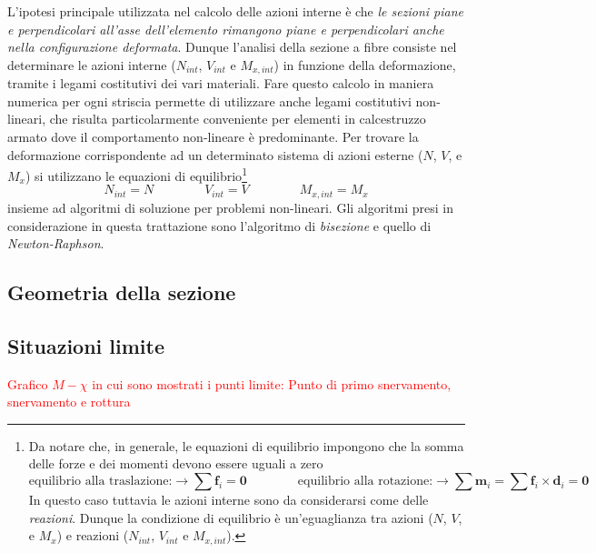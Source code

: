 \documentclass[10pt]{article}
\begin{document}
L'ipotesi principale utilizzata nel calcolo delle azioni interne è che \emph{le sezioni piane e perpendicolari all'asse dell'elemento rimangono piane e perpendicolari anche nella configurazione deformata}.
Dunque l'analisi della sezione a fibre consiste nel determinare le azioni interne ($N_{int}$, $V_{int}$ e $M_{x,int}$) in funzione della deformazione, tramite i legami costitutivi dei vari materiali. Fare questo calcolo in maniera numerica per ogni striscia permette di utilizzare anche legami costitutivi non-lineari, che risulta particolarmente conveniente per elementi in calcestruzzo armato dove il comportamento non-lineare è predominante.
Per trovare la deformazione corrispondente ad un determinato sistema di azioni esterne ($N$, $V$, e $M_x$) si utilizzano le equazioni di equilibrio\footnote{Da notare che, in generale, le equazioni di equilibrio impongono che la somma delle forze e dei momenti devono essere uguali a zero
\begin{equation}
\text{equilibrio alla traslazione:} \rightarrow \sum \mathbf{f}_i = \mathbf{0}
\qquad \qquad
\text{equilibrio alla rotazione:}   \rightarrow \sum \mathbf{m}_i = \sum \mathbf{f}_i \times \mathbf{d}_i = \mathbf{0} 
\end{equation}
In questo caso tuttavia le azioni interne sono da considerarsi come delle \emph{reazioni}. Dunque la condizione di equilibrio è un'eguaglianza tra azioni ($N$, $V$, e $M_x$) e reazioni ($N_{int}$, $V_{int}$ e $M_{x,int}$).}
\begin{equation}
N_{int} = N
\qquad \qquad
V_{int} = V
\qquad \qquad
M_{x,int} = M_x
\end{equation}
insieme ad algoritmi di soluzione per problemi non-lineari. Gli algoritmi presi in considerazione in questa trattazione sono l'algoritmo di \emph{bisezione} e quello di \emph{Newton-Raphson}.



\subsection{Geometria della sezione}



\subsection{Situazioni limite}

\textcolor{red}{Grafico $M-\chi$ in cui sono mostrati i punti limite: Punto di primo snervamento, snervamento e rottura}
\end{document}
